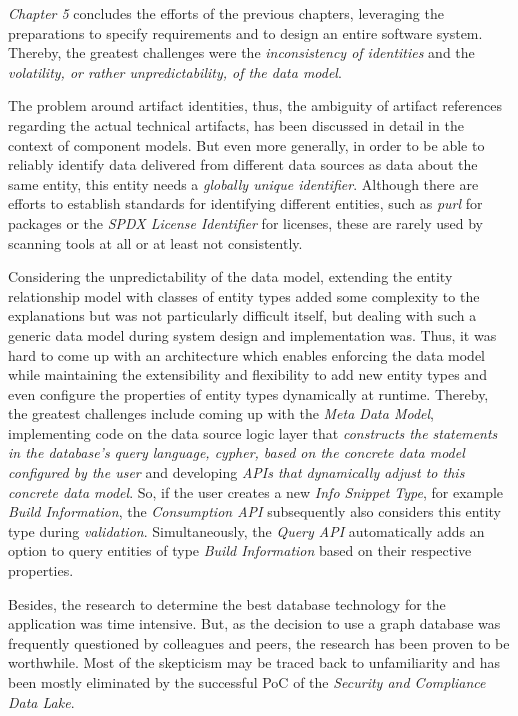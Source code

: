 \emph{Chapter 5} concludes the efforts of the previous chapters, leveraging the preparations to specify requirements and to design an entire software system. Thereby, the greatest challenges were the \emph{inconsistency of identities} and the \emph{volatility, or rather unpredictability, of the data model}.\par
The problem around artifact identities, thus, the ambiguity of artifact references regarding the actual technical artifacts, has been discussed in detail in the context of component models. But even more generally, in order to be able to reliably identify data delivered from different data sources as data about the same entity, this entity needs a \emph{globally unique identifier}. Although there are efforts to establish standards for identifying different entities, such as \emph{purl} for packages or the \emph{SPDX License Identifier} for licenses, these are rarely used by scanning tools at all or at least not consistently.\par
Considering the unpredictability of the data model, extending the entity relationship model with classes of entity types added some complexity to the explanations but was not particularly difficult itself, but dealing with such a generic data model during system design and implementation was. Thus, it was hard to come up with an architecture which enables enforcing the data model while maintaining the extensibility and flexibility to add new entity types and even configure the properties of entity types dynamically at runtime. Thereby, the greatest challenges include coming up with the \emph{Meta Data Model}, implementing code on the data source logic layer that \emph{constructs the statements in the database's query language, cypher, based on the concrete data model configured by the user} and developing \emph{APIs that dynamically adjust to this concrete data model}. So, if the user creates a new \emph{Info Snippet Type}, for example \emph{Build Information}, the \emph{Consumption API} subsequently also considers this entity type during \emph{validation}. Simultaneously, the \emph{Query API} automatically adds an option to query entities of type \emph{Build Information} based on their respective properties.\par
Besides, the research to determine the best database technology for the application was time intensive. But, as the decision to use a graph database was frequently questioned by colleagues and peers, the research has been proven to be worthwhile. Most of the skepticism may be traced back to unfamiliarity and has been mostly eliminated by the successful PoC of the \emph{Security and Compliance Data Lake}.\\

